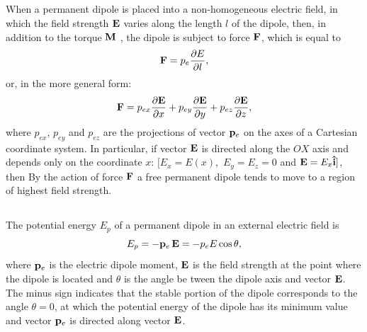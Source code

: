 \subsection{}\label{18.1.6} When a permanent dipole is placed into a non-homogeneous electric field, in which the field strength $\vb{E}$ varies along the length $l$ of the dipole, then, in addition to the torque $\vb{M}$ , the dipole is subject to force $\vb{F}$, which is equal to
\begin{equation*}%
\vb{F} = p_{e} \pdv{E}{l},
\end{equation*}
or, in the more general form:
\begin{equation*}%
\vb{F} = p_{ex} \pdv{\vb{E}}{x} + p_{ey} \pdv{\vb{E}}{y} + p_{ez} \pdv{\vb{E}}{z},
\end{equation*}
where $p_{ex}$, $p_{ey}$ and $p_{ez}$ are the projections of vector $\vb{p}_{e}$ on the axes of a Cartesian coordinate system. In particular, if vector $\vb{E}$ is directed along the $OX$ axis and depends only on the coordinate $x$: $[E_{x} = E (x), \,\, E_{y} = E_{z} = 0$ and $\vb{E} = E_{x}\vu{i}]$, then
By the action of force $\vb{F}$ a free permanent dipole tends to move to a region of highest field strength.

\subsection{}\label{18.1.7} The potential energy $E_{p}$ of a permanent dipole in an external electric field is
\begin{equation*}%
E_{p} = -\vb{p}_{e} \, \vb{E} = - p_{e} E \cos \theta,
\end{equation*}
where $\vb{p}_{e}$ is the electric dipole moment, $\vb{E}$ is the field strength at the point where the dipole is located and $\theta$ is the angle be­ tween the dipole axis and vector $\vb{E}$. The minus sign indicates that the stable portion of the dipole corresponds to the angle $\theta = 0$, at which the potential energy of the dipole has its minimum value and vector $\vb{p}_{e}$ is directed along vector $\vb{E}$.

